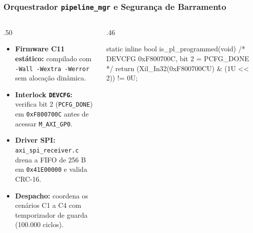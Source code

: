 \begin{frame}[fragile]
  \frametitle{Orquestrador \texttt{pipeline\_mgr} e Seguran\c{c}a de Barramento}
  \begin{columns}[T]
    \begin{column}{.50\textwidth}
      \begin{itemize}
        \item \textbf{Firmware C11 est\'atico:} compilado com \texttt{-Wall -Wextra -Werror} sem aloca\c{c}\~ao din\^amica.
        \item \textbf{Interlock \texttt{DEVCFG}:} verifica bit 2 (\texttt{PCFG\_DONE}) em \texttt{0xF800700C} antes de acessar \texttt{M\_AXI\_GP0}.
        \item \textbf{Driver SPI:} \texttt{axi\_spi\_receiver.c} drena a FIFO de 256 B em \texttt{0x41E00000} e valida CRC-16.
        \item \textbf{Despacho:} coordena os cen\'arios C1 a C4 com temporizador de guarda (100.000 ciclos).
      \end{itemize}
    \end{column}
    \begin{column}{.46\textwidth}
      \begin{ccode}
static inline bool is_pl_programmed(void) {
  /* DEVCFG 0xF800700C, bit 2 = PCFG_DONE */
  return (Xil_In32(0xF800700CU) & (1U << 2)) != 0U;
}
      \end{ccode}
    \end{column}
  \end{columns}
\end{frame}
